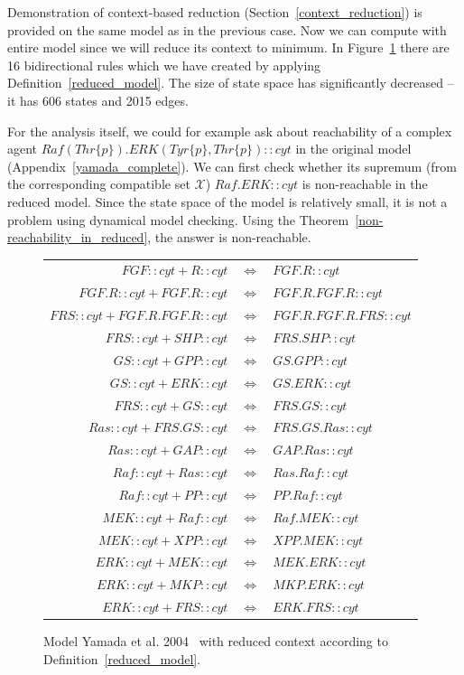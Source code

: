 \documentclass[12pt]{fithesis2}
\begin{document}
Demonstration of context-based reduction (Section~\ref{context_reduction}) is provided on the same model as in the previous case. Now we can compute with entire model since we will reduce its context to minimum. In Figure~\ref{reduced_yamada} there are 16 bidirectional rules which we have created by applying Definition~\ref{reduced_model}. The size of state space has significantly decreased -- it has 606 states and 2015 edges.

For the analysis itself, we could for example ask about reachability of a complex agent {\small $Raf(Thr\{p\}).ERK(Tyr\{p\},Thr\{p\})::cyt$} in the original model (Appendix~\ref{yamada_complete}). We can first check whether its supremum (from the corresponding compatible set $\mathscr{X}$) {\small $Raf.ERK::cyt$} is non-reachable in the reduced model. Since the state space of the model is relatively small, it is not a problem using dynamical model checking. Using the Theorem~\ref{non-reachability_in_reduced}, the answer is non-reachable.

\begin{figure}[!h]
\begin{center}
{\small
\begin{tabular}{r c l}
$FGF::cyt + R::cyt $ & $ \Leftrightarrow $ & $ FGF.R::cyt$\\
$FGF.R::cyt + FGF.R::cyt $ & $ \Leftrightarrow $ & $ FGF.R.FGF.R::cyt$\\
$FRS::cyt + FGF.R.FGF.R::cyt $ & $ \Leftrightarrow $ & $ FGF.R.FGF.R.FRS::cyt$\\
$FRS::cyt + SHP::cyt $ & $ \Leftrightarrow $ & $ FRS.SHP::cyt$\\
$GS::cyt + GPP::cyt $ & $ \Leftrightarrow $ & $ GS.GPP::cyt$\\
$GS::cyt + ERK::cyt $ & $ \Leftrightarrow $ & $ GS.ERK::cyt$\\
$FRS::cyt + GS::cyt $ & $ \Leftrightarrow $ & $ FRS.GS::cyt$\\
$Ras::cyt + FRS.GS::cyt $ & $ \Leftrightarrow $ & $ FRS.GS.Ras::cyt$\\
$Ras::cyt + GAP::cyt $ & $ \Leftrightarrow $ & $ GAP.Ras::cyt$\\
$Raf::cyt + Ras::cyt $ & $ \Leftrightarrow $ & $ Ras.Raf::cyt$\\
$Raf::cyt + PP::cyt $ & $ \Leftrightarrow $ & $ PP.Raf::cyt$\\
$MEK::cyt + Raf::cyt $ & $ \Leftrightarrow $ & $ Raf.MEK::cyt$\\
$MEK::cyt + XPP::cyt $ & $ \Leftrightarrow $ & $ XPP.MEK::cyt$\\
$ERK::cyt + MEK::cyt $ & $ \Leftrightarrow $ & $ MEK.ERK::cyt$\\
$ERK::cyt + MKP::cyt $ & $ \Leftrightarrow $ & $ MKP.ERK::cyt$\\
$ERK::cyt + FRS::cyt $ & $ \Leftrightarrow $ & $ ERK.FRS::cyt$\\
\end{tabular}
}
\end{center}
\caption{Model Yamada et al. 2004~\cite{yamada2004model} with reduced context according to Definition~\ref{reduced_model}.}\label{reduced_yamada}
\end{figure}
\end{document}
